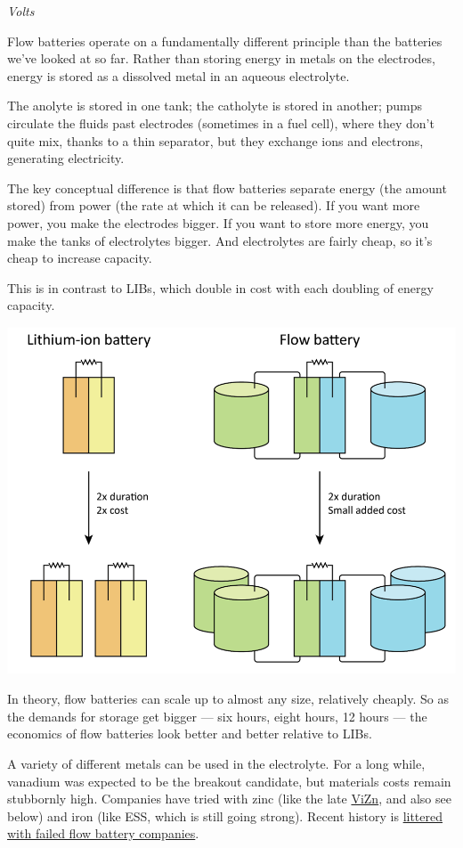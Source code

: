 \documentclass[
]{book}
\begin{document}
\emph{Volts}

Flow batteries operate on a fundamentally different principle than the batteries we've looked at so far. Rather than storing energy in metals on the electrodes, energy is stored as a dissolved metal in an aqueous electrolyte.

The anolyte is stored in one tank; the catholyte is stored in another; pumps circulate the fluids past electrodes (sometimes in a fuel cell), where they don't quite mix, thanks to a thin separator, but they exchange ions and electrons, generating electricity.

The key conceptual difference is that flow batteries separate energy (the amount stored) from power (the rate at which it can be released). If you want more power, you make the electrodes bigger. If you want to store more energy, you make the tanks of electrolytes bigger. And electrolytes are fairly cheap, so it's cheap to increase capacity.

This is in contrast to LIBs, which double in cost with each doubling of energy capacity.

\includegraphics{fig/flow_battery.png}

In theory, flow batteries can scale up to almost any size, relatively cheaply. So as the demands for storage get bigger --- six hours, eight hours, 12 hours --- the economics of flow batteries look better and better relative to LIBs.

A variety of different metals can be used in the electrolyte. For a long while, vanadium was expected to be the breakout candidate, but materials costs remain stubbornly high. Companies have tried with zinc (like the late \href{https://www.greentechmedia.com/articles/read/distressed-vizn-seeks-lifeline-following-staff-layoffs}{ViZn}, and also see below) and iron (like ESS, which is still going strong). Recent history is \href{https://www.greentechmedia.com/articles/read/flow-batteries-struggle-in-2019-as-lithium-ion-marches-on}{littered with failed flow battery companies}.
\end{document}

